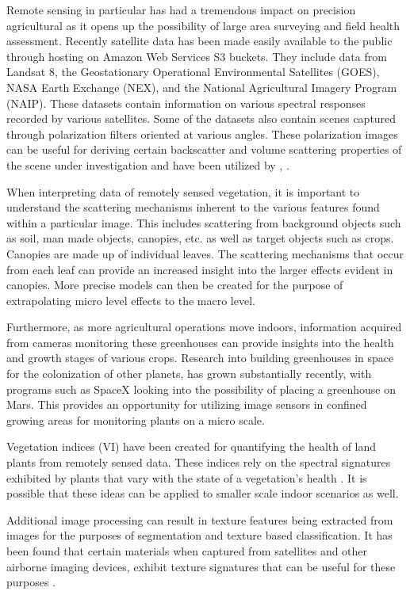Remote sensing in particular has had a tremendous impact on precision agricultural as it opens up the possibility of large area surveying and field health assessment.  Recently satellite data has been made easily available to the public through hosting on Amazon Web Services S3 buckets.  They include data from Landsat 8, the Geostationary Operational Environmental Satellites (GOES), NASA Earth Exchange (NEX), and the National Agricultural Imagery Program (NAIP).  These datasets contain information on various spectral responses recorded by various satellites.  Some of the datasets also contain scenes captured through polarization filters oriented at various angles. These polarization images can be useful for deriving certain backscatter and volume scattering properties of the scene under investigation and have been utilized by \cite{mississippi}, \cite{sarag}.

When interpreting data of remotely sensed vegetation, it is important to understand the scattering mechanisms inherent to the various features found within a particular image.  This includes scattering from background objects such as soil, man made objects, canopies, etc. as well as target objects such as crops. Canopies are made up of individual leaves.  The scattering mechanisms that occur from each leaf can provide an increased insight into the larger effects evident in canopies. More precise models can then be created for the purpose of extrapolating micro level effects to the macro level.

Furthermore, as more agricultural operations move indoors, information acquired from cameras monitoring these greenhouses can provide insights into the health and growth stages of various crops. Research into building greenhouses in space for the colonization of other planets, has grown substantially recently, with programs such as SpaceX looking into the possibility of placing a greenhouse on Mars.  This provides an opportunity for utilizing image sensors in confined growing areas for monitoring plants on a micro scale.

Vegetation indices (VI) have been created for quantifying the health of land plants from remotely sensed data.  These indices rely on the spectral signatures exhibited by plants that vary with the state of a vegetation’s health \cite{remotesensing}.  It is possible that these ideas can be applied to smaller scale indoor scenarios as well.

Additional image processing can result in texture features being extracted from images for the purposes of segmentation and texture based classification.  It has been found that certain materials when captured from satellites and other airborne imaging devices, exhibit texture signatures that can be useful for these purposes \cite{seaice}.

